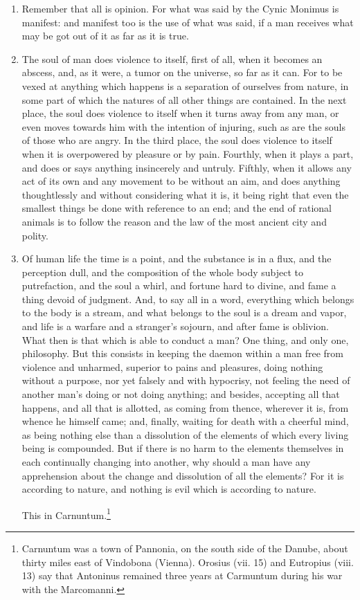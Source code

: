 \begin{enumerate}
\item Remember that all is opinion. For what was said by the Cynic Monimus is manifest: and manifest too is the use of what was said, if a man receives what may be got out of it as far as it is true.

\item The soul of man does violence to itself, first of all, when it becomes an abscess, and, as it were, a tumor on the universe, so far as it can. For to be vexed at anything which happens is a separation of ourselves from nature, in some part of which the natures of all other things are contained. In the next place, the soul does violence to itself when it turns away from any man, or even moves towards him with the intention of injuring, such as are the souls of those who are angry. In the third place, the soul does violence to itself when it is overpowered by pleasure or by pain. Fourthly, when it plays a part, and does or says anything insincerely and untruly. Fifthly, when it allows any act of its own and any movement to be without an aim, and does anything thoughtlessly and without considering what it is, it being right that even the smallest things be done with reference to an end; and the end of rational animals is to follow the reason and the law of the most ancient city and polity.

\item Of human life the time is a point, and the substance is in a flux, and the perception dull, and the composition of the whole body subject to putrefaction, and the soul a whirl, and fortune hard to divine, and fame a thing devoid of judgment. And, to say all in a word, everything which belongs to the body is a stream, and what belongs to the soul is a dream and vapor, and life is a warfare and a stranger's sojourn, and after fame is oblivion. What then is that which is able to conduct a man? One thing, and only one, philosophy. But this consists in keeping the daemon within a man free from violence and unharmed, superior to pains and pleasures, doing nothing without a purpose, nor yet falsely and with hypocrisy, not feeling the need of another man's doing or not doing anything; and besides, accepting all that happens, and all that is allotted, as coming from thence, wherever it is, from whence he himself came; and, finally, waiting for death with a cheerful mind, as being nothing else than a dissolution of the elements of which every living being is compounded. But if there is no harm to the elements themselves in each continually changing into another, why should a man have any apprehension about the change and dissolution of all the elements? For it is according to nature, and nothing is evil which is according to nature.

This in Carnuntum.\footnote{Carnuntum was a town of Pannonia, on the south side of the Danube, about thirty miles east of Vindobona (Vienna). Orosius (vii. 15) and Eutropius (viii. 13) say that Antoninus remained three years at Carmuntum during his war with the Marcomanni.}
\end{enumerate}